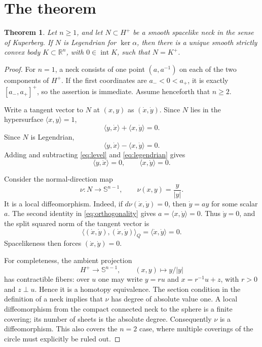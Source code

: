 \documentclass[11pt]{article}
\newtheorem{theorem}{Theorem}
\newcommand{\R}{\mathbb{R}}
\newcommand{\Sph}{\mathbb{S}}
\newcommand{\ip}[2]{\langle #1,#2\rangle}
\begin{document}
\section{\hspace{0.75em}The theorem}

\begin{theorem}
Let $n\ge1$, and let $N\subset H^+$ be a smooth spacelike neck in the sense of
Kuperberg. If $N$ is Legendrian for $\ker\alpha$, then there is a unique smooth
strictly convex body $K\subset\R^n$, with $0\in\operatorname{int}K$, such that
$N=K^+$.
\end{theorem}

\begin{proof}
For $n=1$, a neck consists of one point $(a,a^{-1})$ on each of the two
components of $H^+$. If the first coordinates are $a_-<0<a_+$, it is exactly
$[a_-,a_+]^+$, so the assertion is immediate. Assume henceforth that $n\ge2$.

Write a tangent vector to $N$ at $(x,y)$ as $(\dot x,\dot y)$. Since $N$ lies
in the hypersurface $\ip{x}{y}=1$,
\begin{equation}\label{eq:level}
 \ip{y}{\dot x}+\ip{x}{\dot y}=0.
\end{equation}
Since $N$ is Legendrian,
\begin{equation}\label{eq:legendrian}
 \ip{y}{\dot x}-\ip{x}{\dot y}=0.
\end{equation}
Adding and subtracting \eqref{eq:level} and \eqref{eq:legendrian} gives
\begin{equation}\label{eq:orthogonality}
 \ip{y}{\dot x}=0,
 \qquad
 \ip{x}{\dot y}=0.
\end{equation}

Consider the normal-direction map
\[
 \nu:N\longrightarrow\Sph^{n-1},
 \qquad \nu(x,y)=\frac{y}{|y|}.
\]
It is a local diffeomorphism. Indeed, if $d\nu(\dot x,\dot y)=0$, then
$\dot y=a y$ for some scalar $a$. The second identity in
\eqref{eq:orthogonality} gives $a=\ip{x}{\dot y}=0$. Thus $\dot y=0$, and the
split squared norm of the tangent vector is
\[
 \big\langle(\dot x,\dot y),(\dot x,\dot y)\big\rangle_Q
 =\ip{\dot x}{\dot y}=0.
\]
Spacelikeness then forces $(\dot x,\dot y)=0$.

For completeness, the ambient projection
\[
 H^+\longrightarrow\Sph^{n-1},\qquad (x,y)\longmapsto y/|y|
\]
has contractible fibers: over $u$ one may write
$y=r u$ and $x=r^{-1}u+z$, with $r>0$ and $z\perp u$. Hence it is a homotopy
equivalence. The section condition in the definition of a neck implies that
$\nu$ has degree of absolute value one. A local diffeomorphism from the compact
connected neck to the sphere is a finite covering; its number of sheets is the
absolute degree. Consequently $\nu$ is a diffeomorphism. This also covers the
$n=2$ case, where multiple coverings of the circle must explicitly be ruled
out.


\end{proof}
\end{document}

